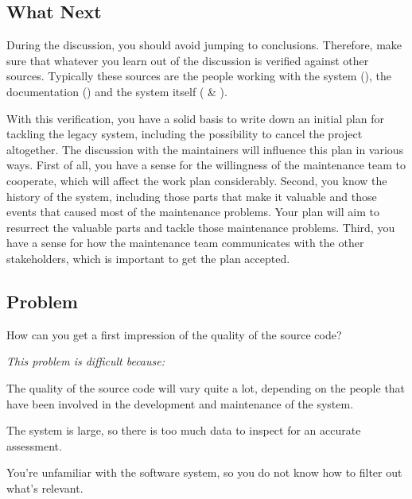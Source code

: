 \documentclass[a4paper,10pt,twoside]{book}
\begin{document}
\subsection*{What Next}

During the discussion, you should avoid jumping to conclusions. Therefore, make sure that whatever you learn out of the discussion is verified against other sources. Typically these sources are the people working with the system (), the documentation () and the system itself (\ie {} \& ).

With this verification, you have a solid basis to write down an initial plan for tackling the legacy system, including the possibility to cancel the project altogether. The discussion with the maintainers will influence this plan in various ways. First of all, you have a sense for the willingness of the maintenance team to cooperate, which will affect the work plan considerably. Second, you know the history of the system, including those parts that make it valuable and those events that caused most of the maintenance problems. Your plan will aim to resurrect the valuable parts and tackle those maintenance problems. Third, you have a sense for how the maintenance team communicates with the other stakeholders, which is important to get the plan accepted.



\subsection*{Problem}

How can you get a first impression of the quality of the source code?

\emph{This problem is difficult because:}

\begin{bulletlist}
  \item The quality of the source code will vary quite a lot, depending on the people that have been involved in the development and maintenance of the system.

  \item The system is large, so there is too much data to inspect for an accurate assessment.

  \item You're unfamiliar with the software system, so you do not know how to filter out what's relevant.

\end{bulletlist}
\end{document}
